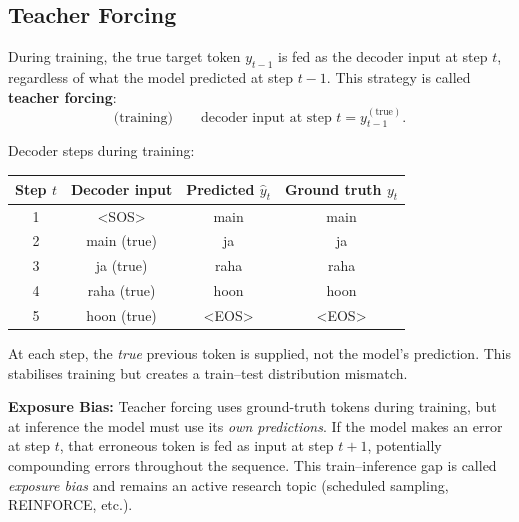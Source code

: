 \documentclass[12pt,a4paper]{article}
\begin{document}
\subsection{Teacher Forcing}

During training, the true target token $y_{t-1}$ is fed as the decoder input at step $t$,
regardless of what the model predicted at step $t-1$. This strategy is called \textbf{teacher
forcing}:
\begin{equation}
  \text{(training)}\qquad \text{decoder input at step }t = y_{t-1}^{(\text{true})}.
  \label{eq:teacher_forcing}
\end{equation}

\begin{example}[title={Teacher Forcing for ``I am going'' $\to$ ``main ja raha hoon''}]
  Decoder steps during training:
  \begin{center}
    \begin{tabular}{@{}cccc@{}}
      \toprule
      Step $t$ & Decoder input & Predicted $\hat{y}_t$ & Ground truth $y_t$ \\
      \midrule
      1 & \textless{}SOS\textgreater & main & main \\
      2 & main (true) & ja & ja \\
      3 & ja (true) & raha & raha \\
      4 & raha (true) & hoon & hoon \\
      5 & hoon (true) & \textless{}EOS\textgreater & \textless{}EOS\textgreater \\
      \bottomrule
    \end{tabular}
  \end{center}
  At each step, the \emph{true} previous token is supplied, not the model's prediction.
  This stabilises training but creates a train--test distribution mismatch.
\end{example}

\begin{warningbox}
  \textbf{Exposure Bias:} Teacher forcing uses ground-truth tokens during training, but at
  inference the model must use its \emph{own predictions}. If the model makes an error at
  step $t$, that erroneous token is fed as input at step $t+1$, potentially compounding
  errors throughout the sequence. This train--inference gap is called \emph{exposure bias}
  and remains an active research topic (scheduled sampling, REINFORCE, etc.).
\end{warningbox}

\end{document}
